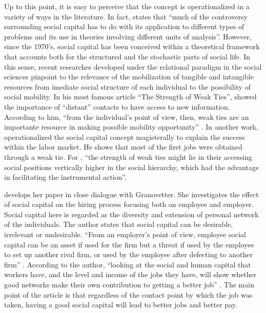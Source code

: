 \documentclass[12pt, english]{article}
\begin{document}
Up to this point, it is easy to perceive that the concept is operationalized in a variety of ways in the literature. In fact, \cite[p. 2]{portes2000two} states that ``much of the controversy surrounding social capital has to do with its application to different types of problems and its use in theories involving different units of analysis''. However, since the 1970's, social capital has been conceived within a theoretical framework that accounts both for the structured and the stochastic parts of social life. In this sense, recent researches developed under the relational paradigm in the social sciences pinpoint to the relevance of the mobilization of tangible and intangible resources from imediate social structure of each individual to the possibility of social mobility. In his most famous article ``The Strength of Weak Ties'', \cite{granovetter1973strength} showed the importance of ``distant'' contacts to have access to new information. According to him, ``from  the  individual's  point  of  view,  then,  weak  ties  are  an  importante resource in making possible mobility opportunity'' \cite[p. 1373]{granovetter1973strength}.  In another work, \cite{granovetter1995getting} operationalized the social capital concept magisterally to explain the success within the labor market. He shows that most of the first jobs were obtained through a weak tie. For \cite[p. 470]{lin1999building}, ``the strength of weak ties might lie in their accessing social positions vertically higher in the social hierarchy, which had the advantage in facilitating the instrumental action''.

\cite{erickson2001good} develops her paper in close dialogue with Granovetter. She investigates the effect of social capital on the hiring process focusing both on employee and employer. Social capital here is regarded as the diversity and extension of personal network of the individuals. The author states that social capital can be desirable, irrelevant or undesirable. ``From an employer's point of view, employee social capital can be an asset if used for the  firm but a threat if used by the employee to set up another rival firm, or used by the employee after defecting to another firm'' \cite[p. 131-2]{erickson2001good}. According to the author, ``looking  at  the  social  and  human  capital  that  workers have,  and  the  level  and income  of  the  jobs  they  have,  will show whether good networks make their own contribution to getting a better job'' \cite[p. 133]{erickson2001good}. The main point of the article is that regardless of the contact point by which the job was taken, having a good social capital will lead to better jobs and better pay.
\end{document}
